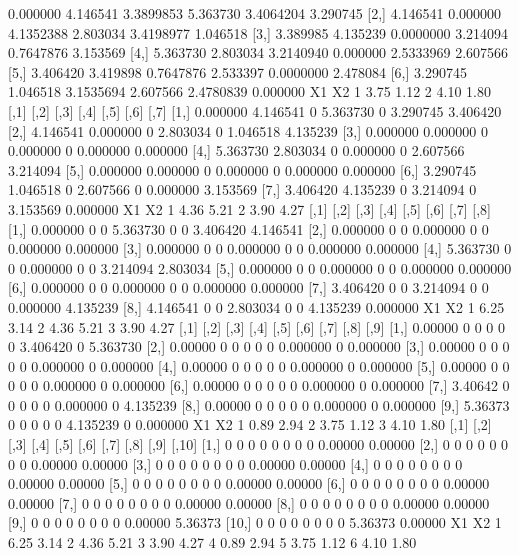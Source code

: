 \documentclass[a4paper, 12pt]{article}
\begin{document}
\begin{itemize}
\begin{Schunk}
\begin{Soutput}
         [,1]     [,2]      [,3]     [,4]      [,5]     [,6]
[1,] 0.000000 4.146541 3.3899853 5.363730 3.4064204 3.290745
[2,] 4.146541 0.000000 4.1352388 2.803034 3.4198977 1.046518
[3,] 3.389985 4.135239 0.0000000 3.214094 0.7647876 3.153569
[4,] 5.363730 2.803034 3.2140940 0.000000 2.5333969 2.607566
[5,] 3.406420 3.419898 0.7647876 2.533397 0.0000000 2.478084
[6,] 3.290745 1.046518 3.1535694 2.607566 2.4780839 0.000000
    X1   X2
1 3.75 1.12
2 4.10 1.80
         [,1]     [,2] [,3]     [,4] [,5]     [,6]     [,7]
[1,] 0.000000 4.146541    0 5.363730    0 3.290745 3.406420
[2,] 4.146541 0.000000    0 2.803034    0 1.046518 4.135239
[3,] 0.000000 0.000000    0 0.000000    0 0.000000 0.000000
[4,] 5.363730 2.803034    0 0.000000    0 2.607566 3.214094
[5,] 0.000000 0.000000    0 0.000000    0 0.000000 0.000000
[6,] 3.290745 1.046518    0 2.607566    0 0.000000 3.153569
[7,] 3.406420 4.135239    0 3.214094    0 3.153569 0.000000
    X1   X2
1 4.36 5.21
2 3.90 4.27
         [,1] [,2] [,3]     [,4] [,5] [,6]     [,7]     [,8]
[1,] 0.000000    0    0 5.363730    0    0 3.406420 4.146541
[2,] 0.000000    0    0 0.000000    0    0 0.000000 0.000000
[3,] 0.000000    0    0 0.000000    0    0 0.000000 0.000000
[4,] 5.363730    0    0 0.000000    0    0 3.214094 2.803034
[5,] 0.000000    0    0 0.000000    0    0 0.000000 0.000000
[6,] 0.000000    0    0 0.000000    0    0 0.000000 0.000000
[7,] 3.406420    0    0 3.214094    0    0 0.000000 4.135239
[8,] 4.146541    0    0 2.803034    0    0 4.135239 0.000000
    X1   X2
1 6.25 3.14
2 4.36 5.21
3 3.90 4.27
         [,1] [,2] [,3] [,4] [,5] [,6]     [,7] [,8]     [,9]
 [1,] 0.00000    0    0    0    0    0 3.406420    0 5.363730
 [2,] 0.00000    0    0    0    0    0 0.000000    0 0.000000
 [3,] 0.00000    0    0    0    0    0 0.000000    0 0.000000
 [4,] 0.00000    0    0    0    0    0 0.000000    0 0.000000
 [5,] 0.00000    0    0    0    0    0 0.000000    0 0.000000
 [6,] 0.00000    0    0    0    0    0 0.000000    0 0.000000
 [7,] 3.40642    0    0    0    0    0 0.000000    0 4.135239
 [8,] 0.00000    0    0    0    0    0 0.000000    0 0.000000
 [9,] 5.36373    0    0    0    0    0 4.135239    0 0.000000
    X1   X2
1 0.89 2.94
2 3.75 1.12
3 4.10 1.80
      [,1] [,2] [,3] [,4] [,5] [,6] [,7] [,8]    [,9]   [,10]
 [1,]    0    0    0    0    0    0    0    0 0.00000 0.00000
 [2,]    0    0    0    0    0    0    0    0 0.00000 0.00000
 [3,]    0    0    0    0    0    0    0    0 0.00000 0.00000
 [4,]    0    0    0    0    0    0    0    0 0.00000 0.00000
 [5,]    0    0    0    0    0    0    0    0 0.00000 0.00000
 [6,]    0    0    0    0    0    0    0    0 0.00000 0.00000
 [7,]    0    0    0    0    0    0    0    0 0.00000 0.00000
 [8,]    0    0    0    0    0    0    0    0 0.00000 0.00000
 [9,]    0    0    0    0    0    0    0    0 0.00000 5.36373
[10,]    0    0    0    0    0    0    0    0 5.36373 0.00000
    X1   X2
1 6.25 3.14
2 4.36 5.21
3 3.90 4.27
4 0.89 2.94
5 3.75 1.12
6 4.10 1.80
\end{Soutput}
\end{Schunk}
	\end{itemize}
\end{document}
